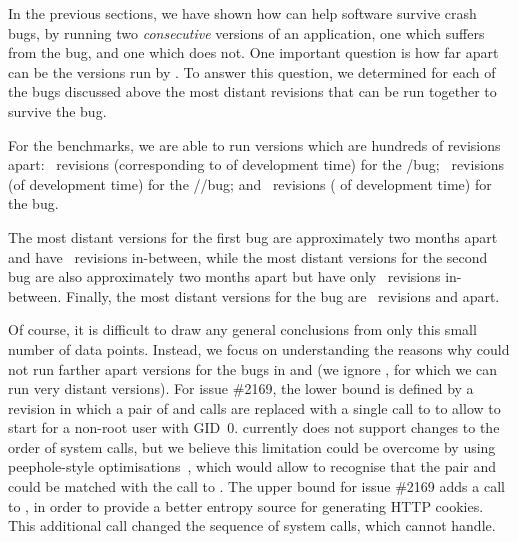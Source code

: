 In the previous sections, we have shown how \mx can help software
survive crash bugs, by running two \textit{consecutive} versions of an
application, one which suffers from the bug, and one which does not.
%
One important question is how far apart can be the versions run
by \mx.  To answer this question, we determined for each of the bugs
discussed above the most distant revisions that can be run together to
survive the bug.  

For the \coreutils benchmarks, we are able to run versions which are
hundreds of revisions apart: \maxDistMdsum~revisions (corresponding to
\timeSpanMdsum of development time) for the \mdsum/\shasum bug; 
\maxDistMkdir~revisions (\timeSpanMkdir of development time) for the 
\mkdir/\mkfifo/\mknod bug; and \maxDistCut~revisions (\timeSpanCut 
of development time) for the \cut bug.

The most distant versions for the first \lighttpd bug are
approximately two months apart and have \maxDistLighttpdOne~revisions
in-between, while the most distant versions for the second
\lighttpd bug are also approximately two months apart but have only
\maxDistLighttpdTwo~revisions in-between.  Finally, the most distant
versions for the \redis bug are \maxDistRedis~revisions
and \timeSpanRedis apart.  

Of course, it is difficult to draw any general conclusions from only
this small number of data points.  Instead, we focus on understanding
the reasons why \mx could not run farther apart versions for the bugs
in \lighttpd and \redis (we ignore \coreutils, for which we can run
very distant versions).
%
For \lighttpd issue \#2169, the lower bound is defined by a revision
in which a pair of  and  calls
are replaced with a single call to  to
allow \lighttpd to start for a non-root user with GID~0.  \mx 
currently does not support changes to the order of system calls, but we believe
this limitation could be overcome by using peephole-style
optimisations~\cite{dragon-book}, which would allow \mx to recognise
that the pair  and  could be
matched with the call to .  The upper bound
for \lighttpd issue \#2169 adds a  call to
, in order to provide a better entropy
source for generating HTTP cookies.  This additional 
call changed the sequence of system calls, which \mx cannot
handle. 

